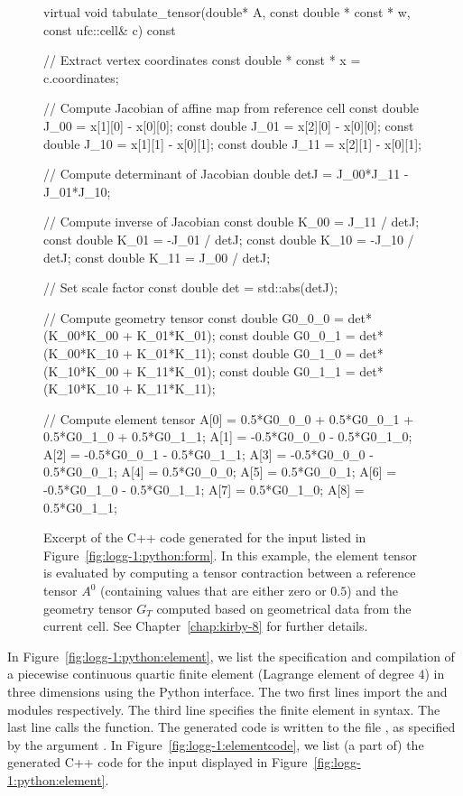 \begin{figure}
\bwfig
  \begin{c++}
virtual void tabulate_tensor(double* A,
                             const double * const * w,
                             const ufc::cell& c) const
{
  // Extract vertex coordinates
  const double * const * x = c.coordinates;

  // Compute Jacobian of affine map from reference cell
  const double J_00 = x[1][0] - x[0][0];
  const double J_01 = x[2][0] - x[0][0];
  const double J_10 = x[1][1] - x[0][1];
  const double J_11 = x[2][1] - x[0][1];

  // Compute determinant of Jacobian
  double detJ = J_00*J_11 - J_01*J_10;

  // Compute inverse of Jacobian
  const double K_00 =  J_11 / detJ;
  const double K_01 = -J_01 / detJ;
  const double K_10 = -J_10 / detJ;
  const double K_11 =  J_00 / detJ;

  // Set scale factor
  const double det = std::abs(detJ);

  // Compute geometry tensor
  const double G0_0_0 = det*(K_00*K_00 + K_01*K_01);
  const double G0_0_1 = det*(K_00*K_10 + K_01*K_11);
  const double G0_1_0 = det*(K_10*K_00 + K_11*K_01);
  const double G0_1_1 = det*(K_10*K_10 + K_11*K_11);

  // Compute element tensor
  A[0] = 0.5*G0_0_0 + 0.5*G0_0_1 + 0.5*G0_1_0 + 0.5*G0_1_1;
  A[1] = -0.5*G0_0_0 - 0.5*G0_1_0;
  A[2] = -0.5*G0_0_1 - 0.5*G0_1_1;
  A[3] = -0.5*G0_0_0 - 0.5*G0_0_1;
  A[4] = 0.5*G0_0_0;
  A[5] = 0.5*G0_0_1;
  A[6] = -0.5*G0_1_0 - 0.5*G0_1_1;
  A[7] = 0.5*G0_1_0;
  A[8] = 0.5*G0_1_1;
}
  \end{c++}
  \caption{Excerpt of the C++ code generated for the input listed in
  Figure~\ref{fig:logg-1:python:form}. In this example, the element tensor is
  evaluated by computing a tensor contraction between a reference
  tensor $A^0$ (containing values that are either zero or $0.5$) and
  the geometry tensor $G_T$ computed based on geometrical data from
  the current cell. See Chapter~\ref{chap:kirby-8} for further details.}
  \label{fig:logg-1:formcode}
\end{figure}

In Figure~\ref{fig:logg-1:python:element}, we list the specification and
compilation of a piecewise continuous quartic finite element (Lagrange
element of degree $4$) in three dimensions using the
\ffc{} Python interface. The two first lines import the \ufl{}
and \ffc{} modules respectively. The third line specifies the finite
element in \ufl{} syntax. The last line calls the \ffc{}
 function. The generated code is written to
the file , as specified by the argument . In
Figure~\ref{fig:logg-1:elementcode}, we list (a part of) the generated
C++ code for the input displayed in Figure~\ref{fig:logg-1:python:element}.

